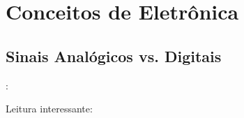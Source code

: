 \section{Conceitos de Eletrônica}


\subsection{Sinais Analógicos vs. Digitais}


\begin{frame}[b]{\insertsection: \insertsubsection}

	\vfill
	Leitura interessante: 

\end{frame}
